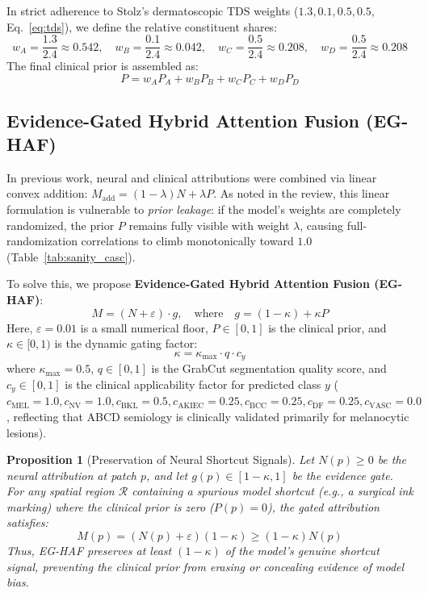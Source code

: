 \documentclass[11pt,a4paper]{article}
\newtheorem{proposition}{Proposition}
\begin{document}
In strict adherence to Stolz's dermatoscopic TDS weights ($1.3, 0.1, 0.5, 0.5$, Eq.~\ref{eq:tds}), we define the relative constituent shares:
\begin{equation}
w_A = \frac{1.3}{2.4} \approx 0.542, \quad w_B = \frac{0.1}{2.4} \approx 0.042, \quad w_C = \frac{0.5}{2.4} \approx 0.208, \quad w_D = \frac{0.5}{2.4} \approx 0.208
\end{equation}
The final clinical prior is assembled as:
\begin{equation}
P = w_A P_A + w_B P_B + w_C P_C + w_D P_D
\end{equation}

\subsection{Evidence-Gated Hybrid Attention Fusion (EG-HAF)}
\label{sec:eg_haf}
In previous work, neural and clinical attributions were combined via linear convex addition: $M_{\text{add}} = (1 - \lambda) N + \lambda P$. As noted in the review, this linear formulation is vulnerable to \emph{prior leakage}: if the model's weights are completely randomized, the prior $P$ remains fully visible with weight $\lambda$, causing full-randomization correlations to climb monotonically toward $1.0$ (Table~\ref{tab:sanity_casc}).

To solve this, we propose \textbf{Evidence-Gated Hybrid Attention Fusion (EG-HAF)}:
\begin{equation}
\label{eq:eg_haf}
M = (N + \varepsilon) \cdot g, \quad \text{where} \quad g = (1 - \kappa) + \kappa P
\end{equation}
Here, $\varepsilon = 0.01$ is a small numerical floor, $P \in [0, 1]$ is the clinical prior, and $\kappa \in [0, 1)$ is the dynamic gating factor:
\begin{equation}
\kappa = \kappa_{\max} \cdot q \cdot c_y
\end{equation}
where $\kappa_{\max} = 0.5$, $q \in [0, 1]$ is the GrabCut segmentation quality score, and $c_y \in [0, 1]$ is the clinical applicability factor for predicted class $y$ ($c_{\text{MEL}} = 1.0, c_{\text{NV}} = 1.0, c_{\text{BKL}} = 0.5, c_{\text{AKIEC}} = 0.25, c_{\text{BCC}} = 0.25, c_{\text{DF}} = 0.25, c_{\text{VASC}} = 0.0$, reflecting that ABCD semiology is clinically validated primarily for melanocytic lesions).

\begin{proposition}[Preservation of Neural Shortcut Signals]
Let $N(p) \ge 0$ be the neural attribution at patch $p$, and let $g(p) \in [1 - \kappa, 1]$ be the evidence gate. For any spatial region $\mathcal{R}$ containing a spurious model shortcut (e.g., a surgical ink marking) where the clinical prior is zero ($P(p) = 0$), the gated attribution satisfies:
\begin{equation}
M(p) = (N(p) + \varepsilon)(1 - \kappa) \ge (1 - \kappa) N(p)
\end{equation}
Thus, EG-HAF preserves at least $(1 - \kappa)$ of the model's genuine shortcut signal, preventing the clinical prior from erasing or concealing evidence of model bias.
\end{proposition}
\end{document}
